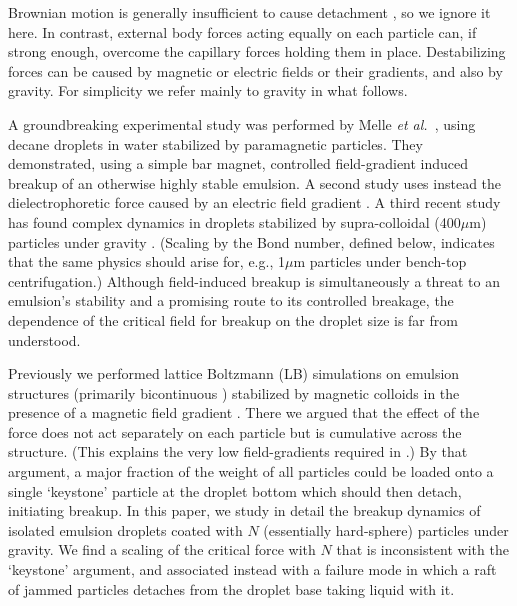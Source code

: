 \documentclass[aps,prl,superscriptaddress,twocolumn,showpacs,floatfix]{revtex4-1}
\begin{document}
Brownian motion is generally insufficient to cause detachment \cite{Aveyard,Kevin}, so we ignore it here. In contrast, external body forces acting equally on each particle can, if strong enough, overcome the capillary forces holding them in place. Destabilizing forces can be caused by magnetic or electric fields or their gradients, and also by gravity. For simplicity we refer mainly to gravity in what follows.

A groundbreaking experimental study was performed by Melle {\it et al.}~\cite{fuller:2005/a}, using decane droplets in water stabilized by paramagnetic particles. They demonstrated, using a simple bar magnet, controlled field-gradient induced breakup of an otherwise highly stable emulsion.  A second study uses instead the dielectrophoretic force caused by an electric field gradient \cite{aubry:2010/a}. A third recent study has found complex dynamics in droplets stabilized by supra-colloidal (400$\mu$m) particles under gravity \cite{Joe}. (Scaling by the Bond number, defined below, indicates that the same physics should arise for, e.g., 1$\mu$m particles under bench-top centrifugation.) Although field-induced breakup is simultaneously a threat to an emulsion's stability and a promising route to its controlled breakage, the dependence of the critical field for breakup on the droplet size is far from understood.

Previously we performed lattice Boltzmann (LB) simulations on emulsion structures (primarily bicontinuous \cite{Kevin,Paul}) stabilized by magnetic colloids in the presence of a magnetic field gradient \cite{kim:one,kim:two}. There we argued that the
effect of the force does not act separately on each particle but is cumulative across the structure. (This explains the very low field-gradients required in \cite{fuller:2005/a}.) By that argument, a major fraction of the weight of all particles 
could be loaded onto a single `keystone' particle at the droplet bottom which should then detach, initiating breakup. 
In this paper, we study in detail the breakup dynamics of isolated emulsion droplets coated with $N$ (essentially hard-sphere) particles under gravity. 
We find a scaling of the critical force with $N$ that is inconsistent with the `keystone' argument, and associated instead with a failure mode in which a raft of jammed particles detaches from the droplet base taking liquid with it.
\end{document}
